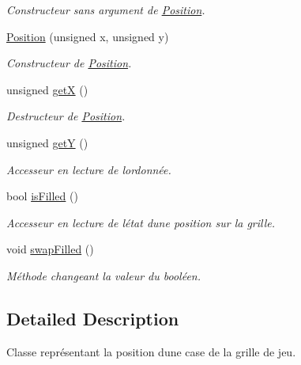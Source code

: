 \begin{DoxyCompactItemize}
\begin{DoxyCompactList}\small\item\em Constructeur sans argument de \hyperlink{class_g_j___g_w_1_1_position}{Position}. \end{DoxyCompactList}\item 
\hyperlink{class_g_j___g_w_1_1_position_ab3e634a5c6392113d2b5f6ecc214997a}{Position} (unsigned x, unsigned y)
\begin{DoxyCompactList}\small\item\em Constructeur de \hyperlink{class_g_j___g_w_1_1_position}{Position}. \end{DoxyCompactList}\item 
unsigned \hyperlink{class_g_j___g_w_1_1_position_a0b6d52cb999972584a19bbd5f72052d2}{getX} ()
\begin{DoxyCompactList}\small\item\em Destructeur de \hyperlink{class_g_j___g_w_1_1_position}{Position}. \end{DoxyCompactList}\item 
unsigned \hyperlink{class_g_j___g_w_1_1_position_adc9a6735a8f67edda3a1d347aa9c8211}{getY} ()
\begin{DoxyCompactList}\small\item\em Accesseur en lecture de l\textquotesingle{}ordonnée. \end{DoxyCompactList}\item 
bool \hyperlink{class_g_j___g_w_1_1_position_a880608d66230d1628c70ce79939c8df9}{is\+Filled} ()
\begin{DoxyCompactList}\small\item\em Accesseur en lecture de l\textquotesingle{}état d\textquotesingle{}une position sur la grille. \end{DoxyCompactList}\item 
void \hyperlink{class_g_j___g_w_1_1_position_a94d7512124fde83c3f0e461ad2514b80}{swap\+Filled} ()\hypertarget{class_g_j___g_w_1_1_position_a94d7512124fde83c3f0e461ad2514b80}{}\label{class_g_j___g_w_1_1_position_a94d7512124fde83c3f0e461ad2514b80}

\begin{DoxyCompactList}\small\item\em Méthode changeant la valeur du booléen. \end{DoxyCompactList}\end{DoxyCompactItemize}


\subsection{Detailed Description}
Classe représentant la position d\textquotesingle{}une case de la grille de jeu. 

